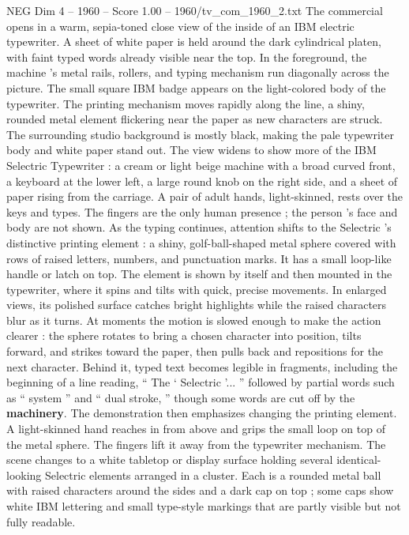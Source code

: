 \begin{textsample}{NEG Dim 4 – 1960 – Score 1.00 – 1960/tv\_com\_1960\_2.txt}  \label{ex:f4_neg_036}
The commercial opens in a warm, sepia-toned close view of the inside of an IBM electric typewriter.
A sheet of white paper is held around the dark cylindrical platen, with faint typed words already visible near the top.
In the foreground, the machine ’s metal rails, rollers, and typing mechanism run diagonally across the picture.
The small square IBM badge appears on the light-colored body of the typewriter.
The printing mechanism moves rapidly along the line, a shiny, rounded metal element flickering near the paper as new characters are struck.
The surrounding studio background is mostly black, making the pale typewriter body and white paper stand out.
The view widens to show more of the IBM Selectric Typewriter : a cream or light beige machine with a broad curved front, a keyboard at the lower left, a large round knob on the right side, and a sheet of paper rising from the carriage.
A pair of adult hands, light-skinned, rests over the keys and types.
The fingers are the only human presence ; the person ’s face and body are not shown.
As the typing continues, attention shifts to the Selectric ’s distinctive printing element : a shiny, golf-ball-shaped metal sphere covered with rows of raised letters, numbers, and punctuation marks.
It has a small loop-like handle or latch on top.
The element is shown by itself and then mounted in the typewriter, where it spins and tilts with quick, precise movements.
In enlarged views, its polished surface catches bright highlights while the raised characters blur as it turns.
At moments the motion is slowed enough to make the action clearer : the sphere rotates to bring a chosen character into position, tilts forward, and strikes toward the paper, then pulls back and repositions for the next character.
Behind it, typed text becomes legible in fragments, including the beginning of a line reading, “ The ‘ Selectric ’... ” followed by partial words such as “ system ” and “ dual stroke, ” though some words are cut off by the \textbf{machinery}.
The demonstration then emphasizes changing the printing element.
A light-skinned hand reaches in from above and grips the small loop on top of the metal sphere.
The fingers lift it away from the typewriter mechanism.
The scene changes to a white tabletop or display surface holding several identical-looking Selectric elements arranged in a cluster.
Each is a rounded metal ball with raised characters around the sides and a dark cap on top ; some caps show white IBM lettering and small type-style markings that are partly visible but not fully readable.

\end{textsample}
